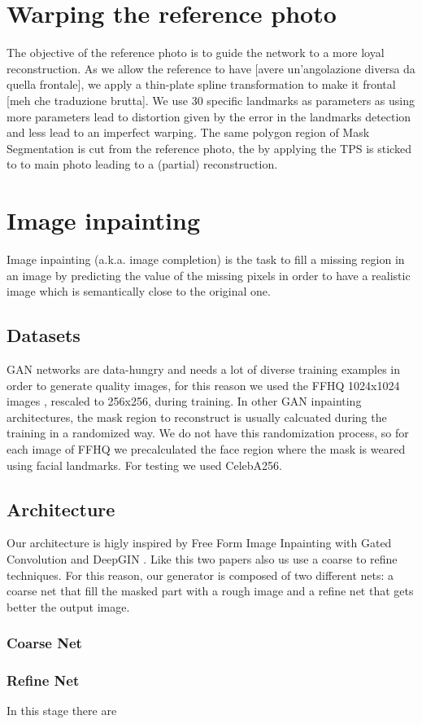 \documentclass[10pt,twocolumn,letterpaper]{article}
\begin{document}
\section{Warping the reference photo}
The objective of the reference photo is to guide the network to a more loyal
reconstruction. As we allow the reference to have [avere un'angolazione diversa
da quella frontale], we apply a thin-plate spline transformation to make it frontal
[meh che traduzione brutta]. We use 30 specific landmarks as parameters as using
more parameters lead to distortion given by the error in the landmarks detection
and less lead to an imperfect warping. The same polygon region of Mask
Segmentation is cut from the reference photo, the by applying the TPS is sticked
to to main photo leading to a (partial) reconstruction.

\section{Image inpainting}

Image inpainting (a.k.a. image completion) is the task to fill a missing region
in an image by predicting the value of the missing pixels in order to have a
realistic image which is semantically close to the original one.
\subsection{Datasets}
GAN networks are data-hungry and needs a lot of diverse training examples in
order to generate quality images, for this reason we used the FFHQ 1024x1024
images \cite{karras2019style}, rescaled to 256x256, during training.  In other GAN inpainting
architectures, the mask region to reconstruct is usually calcuated during the
training in a randomized way.  We do not have this randomization process, so for
each image of FFHQ we precalculated the face region where the mask is weared
using facial landmarks.  For testing we used CelebA256.

\subsection{Architecture}
Our architecture is higly inspired by Free Form Image Inpainting with Gated
Convolution \cite{yu2019free} and DeepGIN \cite{li2020deepgin}. Like this two papers also us use a coarse to refine techniques.
For this reason, our generator is composed of two different nets: a coarse net that fill the masked part with a rough image and a refine net that gets better the output image.
\subsubsection{Coarse Net}
\subsubsection{Refine Net}
In this stage there are

{\small


}
\end{document}
